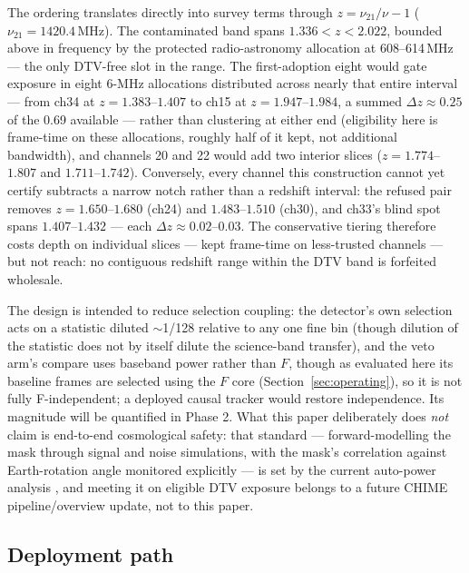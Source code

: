 The ordering translates directly into survey terms through
$z = \nu_{21}/\nu - 1$ ($\nu_{21} = 1420.4$\,MHz). The contaminated
band spans $1.336 < z < 2.022$, bounded above in frequency by the
protected radio-astronomy allocation at 608--614\,MHz --- the only
DTV-free slot in the range. The
first-adoption eight would gate exposure in eight 6-MHz allocations
distributed across nearly that entire interval --- from ch34 at
$z = 1.383$--$1.407$ to ch15 at $z = 1.947$--$1.984$, a summed
$\Delta z \approx 0.25$ of the 0.69 available --- rather than
clustering at either end (eligibility here is frame-time on these
allocations, roughly half of it kept, not additional bandwidth), and
channels 20 and 22 would add two interior slices ($z =
1.774$--$1.807$ and $1.711$--$1.742$). Conversely, every channel this
construction cannot yet certify subtracts a narrow notch rather than
a redshift interval: the refused pair removes $z = 1.650$--$1.680$
(ch24) and $1.483$--$1.510$ (ch30), and ch33's blind spot spans
$1.407$--$1.432$ --- each $\Delta z \approx 0.02$--$0.03$. The
conservative tiering therefore costs depth on individual slices ---
kept frame-time on less-trusted channels --- but not reach: no
contiguous redshift range within the DTV band is forfeited wholesale.

The design is intended to reduce selection
coupling: the detector's own selection acts on a statistic diluted
$\sim$1/128 relative to any one fine bin (though dilution of the
statistic does not by itself dilute the science-band transfer), and the
veto arm's compare uses baseband power rather than $F$, though as
evaluated here its baseline frames are selected using the $F$ core
(Section~\ref{sec:operating}), so it is not fully F-independent; a
deployed causal tracker would restore independence. Its
magnitude will be quantified in Phase 2. What this paper deliberately
does \emph{not} claim is end-to-end cosmological safety: that standard ---
forward-modelling the mask through signal and noise simulations, with the
mask's correlation against Earth-rotation angle monitored explicitly ---
is set by the current auto-power analysis \citep{chime2025autopower}, and
meeting it on eligible DTV exposure belongs to a future CHIME
pipeline/overview update, not to this paper.

\subsection{Deployment path}

